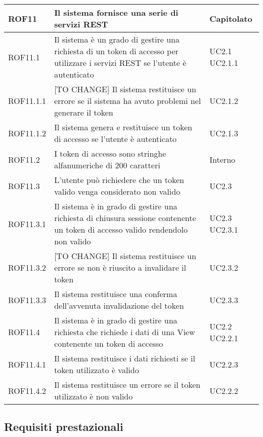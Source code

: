 \begin{center}
\begin{longtable}{| p{2.5cm} | p{8cm} | p{2cm} |}
		ROF11  &  Il sistema fornisce una serie di servizi REST  & Capitolato \\
		\hline
		ROF11.1  &  Il sistema è un grado di gestire una richiesta di un token di accesso per utilizzare i servizi REST se l'utente è autenticato  & UC2.1 \newline UC2.1.1 \\
		\hline
		ROF11.1.1  &  [TO CHANGE] Il sistema restituisce un errore se il sistema ha avuto problemi nel generare il token & UC2.1.2 \\
		\hline
		ROF11.1.2  &  Il sistema genera e restituisce un token di accesso se l'utente è autenticato  & UC2.1.3 \\
		\hline
		ROF11.2  &  I token di accesso sono stringhe alfanumeriche di 200 caratteri  & Interno \\
		\hline
		ROF11.3  &  L'utente può richiedere che un token valido venga considerato non valido  & UC2.3 \\
		\hline
		ROF11.3.1  &  Il sistema è in grado di gestire una richiesta di chiusura sessione contenente un token di accesso valido rendendolo non valido & UC2.3 \newline UC2.3.1 \\
		\hline
		ROF11.3.2  &  [TO CHANGE] Il sistema restituisce un errore se non è riuscito a invalidare il token & UC2.3.2 \\
		\hline
		ROF11.3.3  &  Il sistema restituisce una conferma dell'avvenuta invalidazione del token & UC2.3.3 \\
		\hline
		ROF11.4  &  Il sistema è in grado di gestire una richiesta che richiede i dati di una View contenente un token di accesso  &  UC2.2 \newline UC2.2.1 \\
		\hline
		ROF11.4.1  &  Il sistema restituisce i dati richiesti se il token utilizzato è valido  &  UC2.2.3 \\
		\hline
		ROF11.4.2  &  Il sistema restituisce un errore se il token utilizzato è non valido  &  UC2.2.2 \\
		\hline

	\end{longtable}
	\egroup
\end{center}


\subsection{Requisiti prestazionali}

